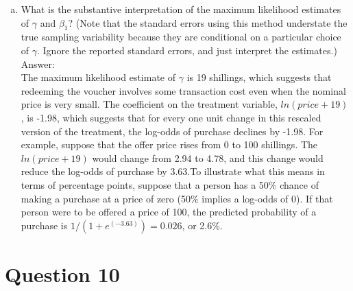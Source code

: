 \documentclass[11pt,notitlepage]{article}\usepackage[]{graphicx}\usepackage[]{color}
\makeatletter
\newenvironment{kframe}{%
 \def\at@end@of@kframe{}%
 \ifinner\ifhmode%
  \def\at@end@of@kframe{\end{minipage}}%
  \begin{minipage}{\columnwidth}%
 \fi\fi%
 \def\FrameCommand##1{\hskip\@totalleftmargin \hskip-\fboxsep
 \colorbox{shadecolor}{##1}\hskip-\fboxsep
     \hskip-\linewidth \hskip-\@totalleftmargin \hskip\columnwidth}%
 \MakeFramed {\advance\hsize-\width
   \@totalleftmargin\z@ \linewidth\hsize
   \@setminipage}}%
 {\par\unskip\endMakeFramed%
 \at@end@of@kframe}
\newenvironment{knitrout}{}{} %
\makeatother
\begin{document}
\begin{enumerate}[a)]
\item What is the substantive interpretation of the maximum likelihood estimates of $\gamma$ and $\beta_1$? (Note that the standard errors using this method understate the true sampling variability because they are conditional on a particular choice of $\gamma$. Ignore the reported standard errors, and just interpret the estimates.)\\
Answer:\\
The maximum likelihood estimate of $\gamma$ is 19 shillings, which suggests that redeeming the voucher involves some transaction cost even when the nominal price is very small.  The coefficient on the treatment variable, $ln(price+19)$, is -1.98, which suggests that for every one unit change in this rescaled version of the treatment, the log-odds of purchase declines by -1.98.  For example, suppose that the offer price rises from 0 to 100 shillings.  The $ln(price+19)$ would change from 2.94 to 4.78, and this change would reduce the log-odds of purchase by 3.63.To illustrate what this means in terms of percentage points, suppose that a person has a 50\% chance of making a purchase at a price of zero (50\% implies a log-odds of 0). If that person were to be offered a price of 100, the predicted probability of a purchase is $1/(1+e^(-3.63) )=0.026$, or 2.6\%. 


\end{enumerate}
\section*{Question 10}
\begin{knitrout}
\color{fgcolor}\begin{kframe}
\begin{verbatim}






\end{verbatim}
\end{kframe}
\end{knitrout}
\end{document}

